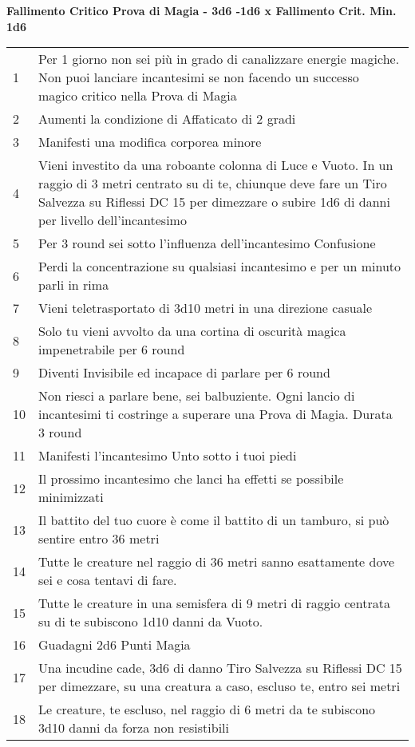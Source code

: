 \documentclass[landscape,10pt,a4paper]{article}
\begin{document}
\begin{multicols}{2}
	\textbf{Fallimento Critico Prova di Magia - 3d6 -1d6 x Fallimento Crit. Min. 1d6}
	\begin{tabularx}{0.95\textwidth}{lX}
		1 & Per 1 giorno non sei più in grado di canalizzare energie magiche. Non puoi lanciare incantesimi se non facendo un successo magico critico nella Prova di Magia\\
		2 & Aumenti la condizione di Affaticato di 2 gradi\\
		3 & Manifesti una modifica corporea minore\\
		4 & Vieni investito da una roboante colonna di Luce e Vuoto. In un raggio di 3 metri centrato su di te, chiunque deve fare un Tiro Salvezza su Riflessi DC 15 per dimezzare o subire 1d6 di danni per livello dell'incantesimo\\
		5 & Per 3 round sei sotto l'influenza dell'incantesimo Confusione\\
		6 & Perdi la concentrazione su qualsiasi incantesimo e per un minuto parli in rima\\
		7 & Vieni teletrasportato di 3d10 metri in una direzione casuale\\
		8 & Solo tu vieni avvolto da una cortina di oscurità magica impenetrabile per 6 round\\
		9 & Diventi Invisibile ed incapace di parlare per 6 round\\
		10 & Non riesci a parlare bene, sei balbuziente. Ogni lancio di incantesimi ti costringe a superare una Prova di Magia. Durata 3 round\\
		11 & Manifesti l'incantesimo Unto sotto i tuoi piedi\\
		12 & Il prossimo incantesimo che lanci ha effetti se possibile minimizzati\\
		13 & Il battito del tuo cuore è come il battito di un tamburo, si può sentire entro 36 metri\\
		14 & Tutte le creature nel raggio di 36 metri sanno esattamente dove sei e cosa tentavi di fare.\\
		15 & Tutte le creature in una semisfera di 9 metri di raggio centrata su di te subiscono 1d10 danni da Vuoto.\\
		16 & Guadagni 2d6 Punti Magia\\
		17 & Una incudine cade, 3d6 di danno Tiro Salvezza su Riflessi DC 15 per dimezzare, su una creatura a caso, escluso te, entro sei metri\\
		18 & Le creature, te escluso, nel raggio di 6 metri da te subiscono 3d10 danni da forza non resistibili
	\end{tabularx}
	

\end{multicols}
\end{document}
